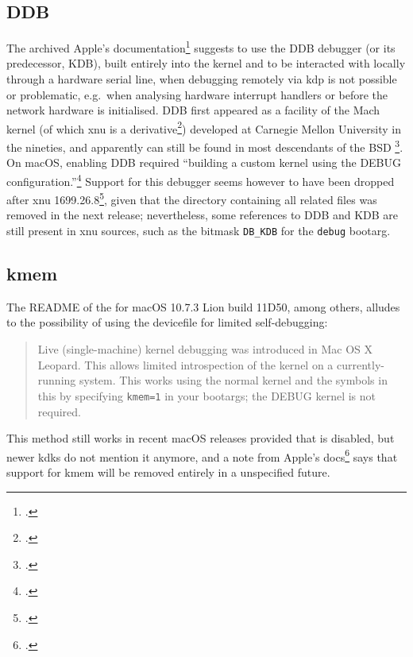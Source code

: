 \subsection{DDB}\label{sec:kdbddb}
The archived Apple's documentation\footcite{DarwinDoc1} suggests to use the DDB debugger (or its predecessor, KDB), built entirely into the kernel and to be interacted with locally through a hardware serial line, when debugging remotely via \gls{kdp} is not possible or problematic, e.g.\ when analysing hardware interrupt handlers or before the network hardware is initialised. DDB first appeared as a facility of the Mach kernel (of which \gls{xnu} is a derivative\footcite{singh2006mac}) developed at Carnegie Mellon University in the nineties, and apparently can still be found in most descendants of the BSD \footcites{FreeBSDDDB,OpenBSDDDB,NetBSDDDB}. On macOS, enabling DDB required \enquote{building a custom kernel using the DEBUG configuration.}\footcite{DarwinDoc1} Support for this debugger seems however to have been dropped after \gls{xnu} 1699.26.8\footcite{XNU1699268}, given that the directory  containing all related files was removed in the next release; nevertheless, some references to DDB and KDB are still present in \gls{xnu} sources, such as the bitmask \lstinline{DB_KDB} for the \lstinline{debug} \gls{bootarg}.

\subsection{kmem}\label{sec:kmem}
The README of the  for macOS 10.7.3 Lion build 11D50, among others, alludes to the possibility of using the \gls{devicefile}  for limited self-debugging:
\blockquote{Live (single-machine) kernel debugging was introduced in Mac OS X Leopard. This allows limited introspection of the kernel on a currently-running system. This works using the normal kernel and the symbols in this  by specifying \lstinline{kmem=1} in your \glspl{bootarg}; the DEBUG kernel is not required.}
This method still works in recent macOS releases provided that  is disabled, but newer \glspl{kdk} do not mention it anymore, and a note from Apple's docs\footcite{DarwinDoc3} says that support for kmem will be removed entirely in a unspecified future.

